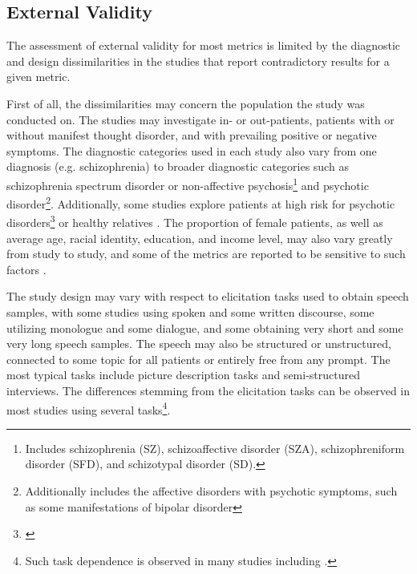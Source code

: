 \subsection{External Validity}
\label{sec:intro:external-validity}

The assessment of external validity for most metrics is limited by the diagnostic and design dissimilarities in the studies that report contradictory results for a given metric. 

First of all, the dissimilarities may concern the population the study was conducted on. The studies may investigate in- or out-patients, patients with or without manifest thought disorder, and with prevailing positive or negative symptoms. The diagnostic categories used in each study also vary from one diagnosis (e.g. schizophrenia) to broader diagnostic categories such as schizophrenia spectrum disorder or non-affective psychosis\footnote{Includes schizophrenia (SZ), schizoaffective disorder (SZA), schizophreniform disorder (SFD),  and schizotypal disorder (SD).} and psychotic disorder\footnote{Additionally includes the affective disorders with psychotic symptoms, such as some manifestations of bipolar disorder}. Additionally, some studies explore patients at high risk for psychotic disorders\footnote{\cite{bedi2015automated, rosenstein2015language, corcoran2018prediction, gupta2018automated, rezaii2019machine, haas2020linking, hitczenko2021understanding, bilgrami2022construct}} or healthy relatives \citep{elvevaag2010automated}. The proportion of female patients, as well as average age, racial identity, education, and income level, may also vary greatly from study to study, and some of the metrics are reported to be sensitive to such factors \citep{hitczenko2021understanding, palaniyappan2021more, minor2023automated}.

The study design may vary with respect to elicitation tasks used to obtain speech samples, with some studies using spoken and some written discourse, some utilizing monologue and some dialogue, and some obtaining very short and some very long speech samples. The speech may also be structured or unstructured, connected to some topic for all patients or entirely free from any prompt. The most typical tasks include picture description tasks and semi-structured interviews. The differences stemming from the elicitation tasks can be observed in most studies using several tasks\footnote{Such task dependence is observed in many studies including \cite{elvevaag2007quantifying, mota2016quantifying, mota2017thought, just2019coherence, ryazanskaya2020thesis}.}.

